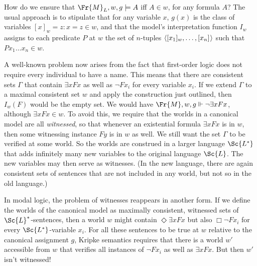 \documentclass[11pt]{woarticle}
\newcommand{\cmnt}[1]{\iffalse #1 \fi}
\theoremstyle{break}
\theoremstyle{nonumberplain}
\newcommand{\SAT}{\Vdash}
\newcommand{\1}{\;\,|\;\,}
\renewcommand{\t}[1]{\ensuremath{\langle #1  \makebox[.2ex]{}\rangle}}
\begin{document}
\cmnt{
  Since $A$ should be true at $w$ iff $A \in w$, the worlds must be
  \emph{maximal} sets: for every sentence $A$ and world $w$, either $A
  \in w$ or $\neg A \in w$. Moreover, if the logic $L$ is sound with
  respect to $\Fr{M}_L$, the worlds must be
  \emph{$L$-consistent}. Otherwise there would be sentences
  $A_1,\ldots,A_n \in w$ and hence $w,V \SAT A_1\land \ldots \land
  A_n$ while $\vdash_L \neg (A_1\land \ldots \land A_n)$. However, we
  will see that the worlds in our canonical models only have an
  $L$-consistent fragment.
}

How do we ensure that $\Fr{M}_{L},w,g \models A$ iff $A \in w$, for any formula
$A$? The usual approach is to stipulate that for any variable $x$, $g(x)$ is the
class of variables $[x]_{w} = { z: x\!=\!z \in w }$, and that the model's
interpretation function $I_{w}$ assigns to each predicate $P$ at $w$ the set of
$n$-tuples $\t{[x_1]_w,\ldots,[x_n]}$ such that $Px_1\ldots x_n \in w$.

A well-known problem now arises from the fact that first-order logic does not
require every individual to have a name. This means that there are consistent
sets $\Gamma$ that contain $\exists x Fx$ as well as $\neg Fx_i$ for every
variable $x_i$. If we extend $\Gamma$ to a maximal consistent set $w$ and apply
the construction just outlined, then $I_w(F)$ would be the empty set. We would
have $\Fr{M},w,g \SAT \neg \exists x Fx$, although $\exists x Fx \in w$. To
avoid this, we require that the worlds in a canonical model are all
\emph{witnessed}, so that whenever an existential formula $\exists x Fx$ is in
$w$, then some witnessing instance $Fy$ is in $w$ as well. We still want the
set $\Gamma$ to be verified at some world. So the worlds are construed in a
larger language $\Sc{L^*}$ that adds infinitely many new variables to the
original language $\Sc{L}$. The new variables may then serve as witnesses. (In
the new language, there are again consistent sets of sentences that are not
included in any world, but not so in the old language.)
 
In modal logic, the problem of witnesses reappears in another form. If we define
the worlds of the canonical model as maximally consistent, witnessed sets of
$\Sc{L}^{*}$-sentences, then a world $w$ might contain $\Diamond \exists x Fx$
but also $\Box \neg Fx_i$ for every $\Sc{L^*}$-variable $x_i$. For all these
sentences to be true at $w$ relative to the canonical assignment $g$, Kripke
semantics requires that there is a world $w'$ accessible from $w$ that verifies
all instances of $\neg Fx_i$ as well as $\exists x Fx$. But then $w'$ isn't
witnessed!
\end{document}
